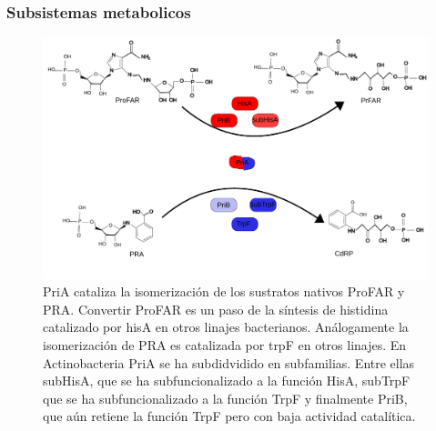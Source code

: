 \documentclass[]{article}
\begin{document}
\subsubsection{Subsistemas metabolicos}\label{subsistemas-metabolicos}

\begin{figure}[h!tbp]
\centering
\includegraphics[angle = 0,scale = 0.6]{PriA.pdf}
\caption[PriA isomeriza los sustratos PRA y ProFAR ]{\footnotesize{PriA cataliza la isomerización  de los sustratos nativos ProFAR y PRA. Convertir ProFAR es un paso de la síntesis de histidina catalizado por {hisA} en otros linajes bacterianos. Análogamente la isomerización de PRA es catalizada por {trpF} en otros linajes. En Actinobacteria PriA se ha subdidvidido en subfamilias. Entre ellas subHisA, que se ha subfuncionalizado a la función HisA, subTrpF que se ha subfuncionalizado a la función TrpF y finalmente PriB, que aún retiene la función TrpF pero con baja actividad catalítica.  }}
\label{fig:priAFigure}
\end{figure}
\end{document}
